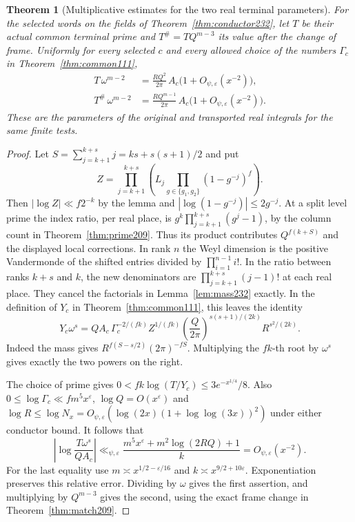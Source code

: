 \documentclass[a4paper,11pt]{article}
\newtheorem{theorem}[proposition]{Theorem}
\theoremstyle{definition}
\theoremstyle{remark}
\numberwithin{equation}{section}
\begin{document}
\begin{theorem}[Multiplicative estimates for the two real terminal parameters]
\label{thm:terminal232}
For the selected words on the fields of Theorem~\ref{thm:conductor232},
let \(T\) be their actual common terminal prime and
\(T^\#=TQ^{m-3}\) its value after the change of frame.
Uniformly for every selected \(c\) and every allowed choice of the
numbers \(\Gamma_c\) in Theorem~\ref{thm:common111},
\[
 \begin{aligned}
 T\,\omega^{m-2}
     &=\frac{RQ^2}{2\pi}\,A_c\bigl(1+O_{\psi,\varepsilon}(x^{-2})\bigr),\\
 T^\#\,\omega^{m-2}
     &=\frac{RQ^{m-1}}{2\pi}\,A_c\bigl(1+O_{\psi,\varepsilon}(x^{-2})\bigr).
 \end{aligned}
\]
These are the parameters of the original and transported real
integrals for the same finite tests.
\end{theorem}
\begin{proof}
Let \(S=\sum_{j=k+1}^{k+s}j=ks+s(s+1)/2\) and put
\[
  Z=\prod_{j=k+1}^{k+s}\left(L_j
              \prod_{g\in\{g_1,g_2\}}(1-g^{-j})^f\right).
\]
Then \(|\log Z|\ll f2^{-k}\) by the lemma and
\(|\log(1-g^{-j})|\le2g^{-j}\).
At a split level prime the index ratio, per real place, is
\(g^k\prod_{j=k+1}^{k+s}(g^j-1)\), by the column count in
Theorem~\ref{thm:prime209}.
Thus its product contributes \(Q^{f(k+S)}\) and the displayed
local corrections. In rank \(n\) the Weyl dimension is the
positive Vandermonde of the shifted entries divided by
\(\prod_{i=1}^{n-1} i!\). In the ratio between ranks \(k+s\)
and \(k\), the new denominators are \(\prod_{j=k+1}^{k+s}(j-1)!\)
at each real place. They cancel the factorials in
Lemma~\ref{lem:mass232} exactly. In the definition of \(Y_c\)
in Theorem~\ref{thm:common111}, this leaves the identity
\[
 Y_c\omega^s=Q A_c\,\Gamma_c^{-2/(fk)}Z^{1/(fk)}
      \left(\frac{Q}{2\pi}\right)^{s(s+1)/(2k)}
       R^{s^2/(2k)} .
\]
Indeed the mass gives \(R^{f(S-s/2)}(2\pi)^{-fS}\).
Multiplying the \(fk\)-th root by \(\omega^s\) gives exactly
the two powers on the right.

The choice of prime gives \(0<fk\log(T/Y_c)\le3e^{-x^{1/4}}/8\).
Also \(0\le\log\Gamma_c\ll fm^5 x^\varepsilon\),
\(\log Q=O(x^\varepsilon)\) and
\(\log R\le \log N_x=O_{\psi,\varepsilon}(\log(2x)
 (1+\log\log(3x))^2)\) under either conductor bound.
It follows that
\[
 \left|\log\frac{T\omega^s}{Q A_c}\right|
 \ll_{\psi,\varepsilon}
       \frac{m^5x^\varepsilon+m^2\log(2RQ)+1}{k}
        = O_{\psi,\varepsilon}(x^{-2}).
\]
For the last equality use \(m\asymp x^{1/2-\varepsilon/16}\)
and \(k\asymp x^{9/2+10\varepsilon}\). Exponentiation preserves
this relative error. Dividing by \(\omega\) gives the first
assertion, and multiplying by \(Q^{m-3}\) gives the second,
using the exact frame change in Theorem~\ref{thm:match209}.
\end{proof}
\end{document}
